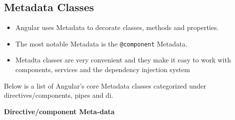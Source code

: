 \documentclass[12pt,]{article}
\providecommand{\tightlist}{%
  \setlength{\itemsep}{0pt}\setlength{\parskip}{0pt}}
\begin{document}
\subsection{Metadata Classes}\label{metadata-classes}

\begin{itemize}
\tightlist
\item
  Angular uses Metadata to decorate classes, methods and properties.
\item
  The most notable Metadata is the \texttt{@component} Metadata.
\item
  Metadta classes are very convenient and they make it easy to work with
  components, services and the dependency injection system
\end{itemize}

Below is a list of Angular's core Metadata classes categorized under
directives/components, pipes and di.

\textbf{Directive/component Meta-data}
\end{document}
